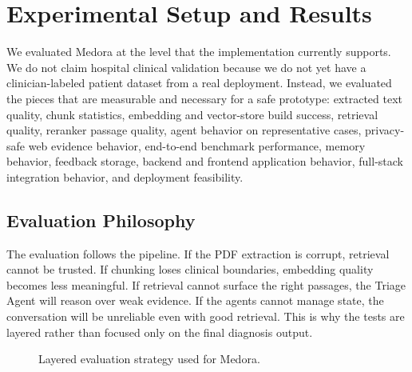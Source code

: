
\chapter{Experimental Setup and Results}
\label{chapter:Experiments_Results}

We evaluated Medora at the level that the implementation currently supports. We do not claim hospital clinical validation because we do not yet have a clinician-labeled patient dataset from a real deployment. Instead, we evaluated the pieces that are measurable and necessary for a safe prototype: extracted text quality, chunk statistics, embedding and vector-store build success, retrieval quality, reranker passage quality, agent behavior on representative cases, privacy-safe web evidence behavior, end-to-end benchmark performance, memory behavior, feedback storage, backend and frontend application behavior, full-stack integration behavior, and deployment feasibility.

\section{Evaluation Philosophy}

The evaluation follows the pipeline. If the PDF extraction is corrupt, retrieval cannot be trusted. If chunking loses clinical boundaries, embedding quality becomes less meaningful. If retrieval cannot surface the right passages, the Triage Agent will reason over weak evidence. If the agents cannot manage state, the conversation will be unreliable even with good retrieval. This is why the tests are layered rather than focused only on the final diagnosis output.

\begin{figure}[htbp]
\centering
{}
\caption{Layered evaluation strategy used for Medora.}
\label{fig:evaluation_layers}
\end{figure}

